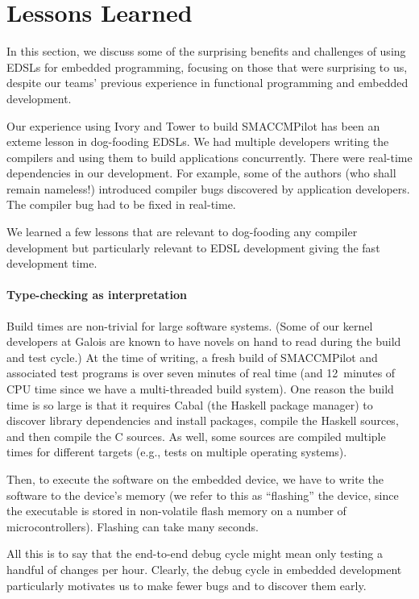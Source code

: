 \section{Lessons Learned}
\label{sec:thegood}

In this section, we discuss some of the surprising benefits and challenges of
using EDSLs for embedded programming, focusing on those that were surprising to
us, despite our teams' previous experience in functional programming and
embedded development.

Our experience using Ivory and Tower to build SMACCMPilot has been an exteme
lesson in dog-fooding EDSLs.  We had multiple developers writing the compilers
and using them to build applications concurrently.  There were real-time
dependencies in our development.  For example, some of the authors (who shall
remain nameless!)  introduced compiler bugs discovered by application
developers.  The compiler bug had to be fixed in real-time.

We learned a few lessons that are relevant to dog-fooding any compiler
development but particularly relevant to EDSL development giving the fast
development time.

\paragraph{Type-checking as interpretation}
Build times are non-trivial for large software systems.  (Some of our kernel
developers at Galois are known to have novels on hand to read during the build
and test cycle.)  At the time of writing, a fresh build of SMACCMPilot and
associated test programs is over seven minutes of real time (and 12~minutes of
CPU time since we have a multi-threaded build system).  One reason the build
time is so large is that it requires Cabal (the Haskell package manager) to
discover library dependencies and install packages, compile the Haskell sources,
and then compile the C sources.  As well, some sources are compiled multiple
times for different targets (e.g., tests on multiple operating systems).

Then, to execute the software on the embedded device, we have to write the
software to the device's memory (we refer to this as ``flashing'' the device,
since the executable is stored in non-volatile flash memory on a number of
microcontrollers).  Flashing can take many seconds.

All this is to say that the end-to-end debug cycle might mean only testing a
handful of changes per hour.  Clearly, the debug cycle in embedded development
particularly motivates us to make fewer bugs and to discover them early.

